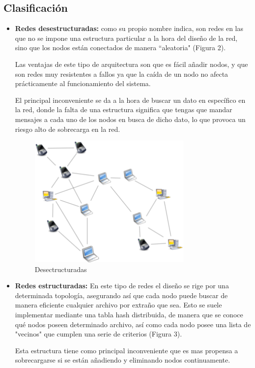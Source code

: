\documentclass[11pt,a4paper]{article}
\begin{document}
\subsection{Clasificación}

\begin{itemize}
	\item \textbf{Redes desestructuradas:} como su propio nombre indica, son redes en las que no se impone una estructura particular a la hora del diseño de la red, sino que los nodos están conectados de manera ``aleatoria" (Figura 2).

Las ventajas de este tipo de arquitectura son que es fácil añadir nodos, y que son redes muy resistentes a fallos ya que la caída de un nodo no afecta prácticamente al funcionamiento del sistema.

El principal inconveniente se da a la hora de buscar un dato en específico en la red, donde la falta de una estructura significa que tengas que mandar mensajes a cada uno de los nodos en busca de dicho dato, lo que provoca un riesgo alto de sobrecarga en la red.

\begin{figure}[h]
	\includegraphics[width=8cm]{Unstructured.png}
	\centering		
	\caption{Desectructuradas}
	\label{p5}
\end{figure}

	\item \textbf{Redes estructuradas:} En este tipo de redes el diseño se rige por una determinada topología, asegurando así que cada nodo puede buscar de manera eficiente cualquier archivo por extraño que sea. Esto se suele implementar mediante una tabla hash distribuida, de manera que se conoce qué nodos poseen determinado archivo, así como cada nodo posee una lista de "vecinos" que cumplen una serie de criterios (Figura 3).

Esta estructura tiene como principal inconveniente que es mas propensa a sobrecargarse si se están añadiendo y eliminando nodos continuamente.


\end{itemize}
\end{document}
